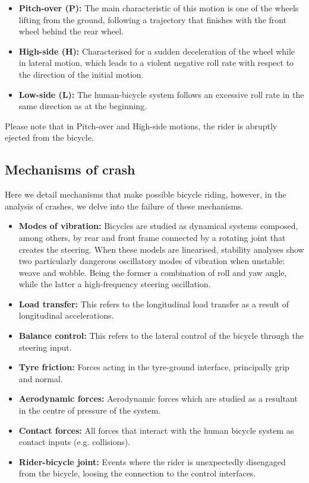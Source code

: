 \documentclass{article}
\begin{document}
\begin{itemize}
    \item \textbf{Pitch-over (P):} The main characteristic of this motion is one of the wheels lifting from the ground, following a trajectory that finishes with the front wheel behind the rear wheel.
    \item \textbf{High-side (H):} Characterised for a sudden deceleration of the wheel while in lateral motion, which leads to a violent negative roll rate with respect to the direction of the initial motion.
    \item \textbf{Low-side (L):} The human-bicycle system follows an excessive roll rate in the same direction as at the beginning.
\end{itemize}

Please note that in Pitch-over and High-side motions, the rider is abruptly ejected from the bicycle.


\subsection{Mechanisms of crash}

Here we detail mechanisms that make possible bicycle riding, however, in the analysis of crashes, we delve into the failure of these mechanisms.

\begin{itemize}
    \item \textbf{Modes of vibration:} Bicycles are studied as dynamical systems composed, among others, by rear and front frame connected by a rotating joint that creates the steering.
        When these models are linearised, stability analyses show two particularly dangerous oscillatory modes of vibration when unstable: weave and wobble.
        Being the former a combination of roll and yaw angle, while the latter a high-frequency steering oscillation.
    \item \textbf{Load transfer:} This refers to the longitudinal load transfer as a result of longitudinal accelerations.
    \item \textbf{Balance control:} This refers to the lateral control of the bicycle through the steering input.
    \item \textbf{Tyre friction:} Forces acting in the tyre-ground interface, principally grip and normal.
    \item \textbf{Aerodynamic forces:} Aerodynamic forces which are studied as a resultant in the centre of pressure of the system.
    \item \textbf{Contact forces:} All forces that interact with the human bicycle system as contact inputs (e.g. collisions).
    \item \textbf{Rider-bicycle joint:} Events where the rider is unexpectedly disengaged from the bicycle, loosing the connection to the control interfaces.
\end{itemize}
\end{document}
